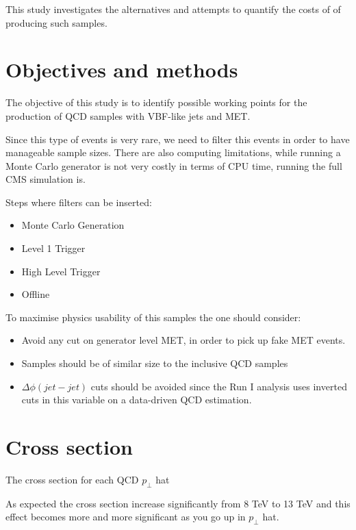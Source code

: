 \documentclass[a4paper]{article}
\begin{document}
This study investigates the alternatives and attempts to quantify the costs of of producing such samples.

\section{Objectives and methods}

The objective of this study is to identify possible working points for the production of QCD samples with VBF-like jets and MET. 

Since this type of events is very rare, we need to filter this events in order to have manageable sample sizes. There are also computing limitations, while running a Monte Carlo generator is not very costly in terms of CPU time, running the full CMS simulation is.

Steps where filters can be inserted:
\begin{itemize}
 \item Monte Carlo Generation
 \item Level 1 Trigger
 \item High Level Trigger
 \item Offline
\end{itemize}

To maximise physics usability of this samples the one should consider:
\begin{itemize}
  \item Avoid any cut on generator level MET, in order to pick up fake MET events.
  \item Samples should be of similar size to the inclusive QCD samples
  \item $\Delta\phi(jet-jet)$ cuts should be avoided since the Run I analysis uses inverted cuts in this variable on a data-driven QCD estimation.
\end{itemize}

\section{Cross section}

The cross section for each QCD $p_\perp$ hat 



As expected the cross section increase significantly from 8 TeV to 13 TeV and this effect becomes more and more significant as you go up in $p_\perp$ hat.


\end{document}
